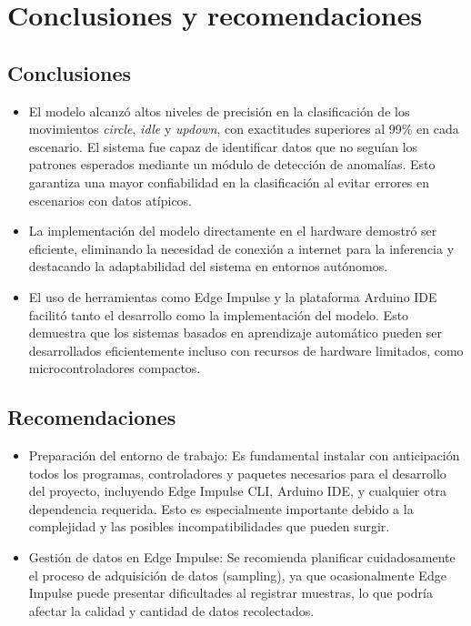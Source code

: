 \documentclass[12pt,a4paper]{article}
\begin{document}
\section{Conclusiones y recomendaciones}
\subsection{Conclusiones}  
\begin{itemize}
    \item El modelo alcanzó altos niveles de precisión en la clasificación de los movimientos \textit{circle}, \textit{idle} y \textit{updown}, con exactitudes superiores al 99\% en cada escenario.  El sistema fue capaz de identificar datos que no seguían los patrones esperados mediante un módulo de detección de anomalías. Esto garantiza una mayor confiabilidad en la clasificación al evitar errores en escenarios con datos atípicos.
    \item La implementación del modelo directamente en el hardware demostró ser eficiente, eliminando la necesidad de conexión a internet para la inferencia y destacando la adaptabilidad del sistema en entornos autónomos.  
    \item El uso de herramientas como Edge Impulse y la plataforma Arduino IDE facilitó tanto el desarrollo como la implementación del modelo. Esto demuestra que los sistemas basados en aprendizaje automático pueden ser desarrollados eficientemente incluso con recursos de hardware limitados, como microcontroladores compactos.
\end{itemize}

\subsection{Recomendaciones}  
\begin{itemize}
    \item Preparación del entorno de trabajo: Es fundamental instalar con anticipación todos los programas, controladores y paquetes necesarios para el desarrollo del proyecto, incluyendo Edge Impulse CLI, Arduino IDE, y cualquier otra dependencia requerida. Esto es especialmente importante debido a la complejidad y las posibles incompatibilidades que pueden surgir.  
    \item Gestión de datos en Edge Impulse: Se recomienda planificar cuidadosamente el proceso de adquisición de datos (sampling), ya que ocasionalmente Edge Impulse puede presentar dificultades al registrar muestras, lo que podría afectar la calidad y cantidad de datos recolectados.  
\end{itemize}
\end{document}
